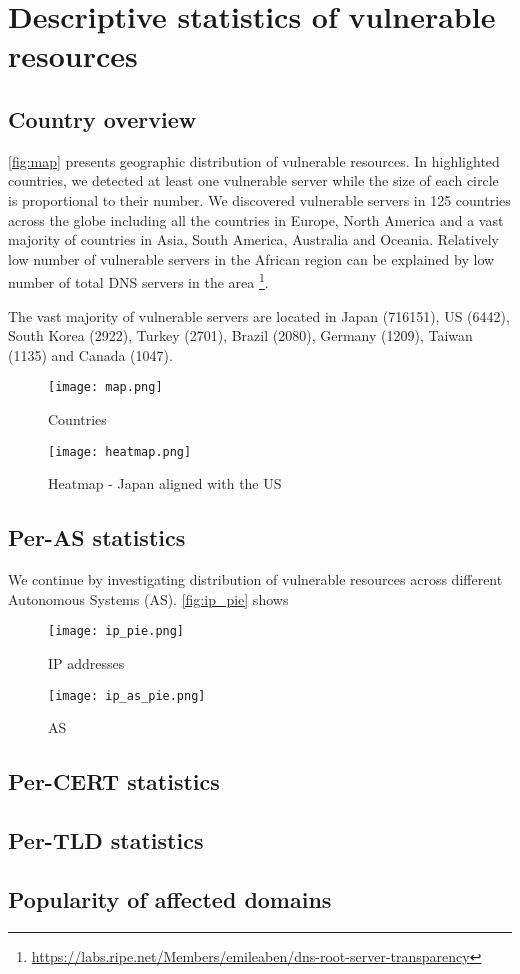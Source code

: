 \section{Descriptive statistics of vulnerable resources}
\subsection{Country overview}
\autoref{fig:map} presents geographic distribution of vulnerable resources. In highlighted countries, we detected at least one vulnerable server while the size of each circle is proportional to their number. We discovered vulnerable servers in 125 countries across the globe including all the countries in Europe, North America and a vast majority of countries in Asia, South America, Australia and Oceania. Relatively low number of vulnerable servers in the African region can be explained by low number of total DNS servers in the area \footnote{\url{https://labs.ripe.net/Members/emileaben/dns-root-server-transparency}}. 

The vast majority of vulnerable servers are located in Japan (716151), US (6442), South Korea (2922), Turkey (2701), Brazil (2080), Germany (1209), Taiwan (1135) and Canada (1047). 

\begin{figure}[!hbt]
\centering
\texttt{[image: map.png]}
\caption{Countries}
\label{fig:map}
\end{figure}

\begin{figure}[!hbt]
\centering
\texttt{[image: heatmap.png]}
\caption{Heatmap - Japan aligned with the US}
\label{fig:heatmap}
\end{figure}

\subsection{Per-AS statistics}
We continue by investigating distribution of vulnerable resources across different Autonomous Systems (AS). \autoref{fig:ip_pie} shows 
\begin{figure}[!hbt]
\centering
\texttt{[image: ip\_pie.png]}
\caption{IP addresses}
\label{fig:ip_pie}
\end{figure}

\begin{figure}[!hbt]
\centering
\texttt{[image: ip\_as\_pie.png]}
\caption{AS}
\label{fig:ip_as_pie}
\end{figure}

\subsection{Per-CERT statistics}
\subsection{Per-TLD statistics}
\subsection{Popularity of affected domains}
